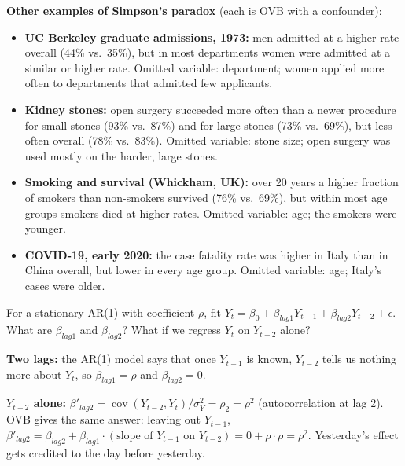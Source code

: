 \documentclass[11pt]{article}
\newcommand{\Cov}{\operatorname{cov}}
\begin{document}
\textbf{Other examples of Simpson's paradox} (each is OVB with a confounder):
\begin{itemize}[leftmargin=*,itemsep=2pt]
\item \textbf{UC Berkeley graduate admissions, 1973:} men admitted at a higher rate overall (44\% vs.\ 35\%), but in most departments women were
admitted at a similar or higher rate. Omitted variable: department; women applied more often to departments that admitted few applicants.
\item \textbf{Kidney stones:} open surgery succeeded more often than a newer procedure for small stones (93\% vs.\ 87\%) and for large stones
(73\% vs.\ 69\%), but less often overall (78\% vs.\ 83\%). Omitted variable: stone size; open surgery was used mostly on the harder, large stones.
\item \textbf{Smoking and survival (Whickham, UK):} over 20 years a higher fraction of smokers than non-smokers survived (76\% vs.\ 69\%), but
within most age groups smokers died at higher rates. Omitted variable: age; the smokers were younger.
\item \textbf{COVID-19, early 2020:} the case fatality rate was higher in Italy than in China overall, but lower in every age group.
Omitted variable: age; Italy's cases were older.
\end{itemize}

\begin{examplebox}[title={Question (10/14): regressing an AR(1) on two lags}]
For a stationary AR(1) with coefficient $\rho$, fit $Y_t=\beta_0+\beta_{lag1}Y_{t-1}+\beta_{lag2}Y_{t-2}+\epsilon$. What are $\beta_{lag1}$ and
$\beta_{lag2}$? What if we regress $Y_t$ on $Y_{t-2}$ alone?

\textbf{Two lags:} the AR(1) model says that once $Y_{t-1}$ is known, $Y_{t-2}$ tells us nothing more about $Y_t$, so $\beta_{lag1}=\rho$ and
$\beta_{lag2}=0$.

\textbf{$Y_{t-2}$ alone:} $\beta'_{lag2}=\Cov(Y_{t-2},Y_t)/\sigma_Y^2=\rho_2=\rho^2$ (autocorrelation at lag 2). OVB gives the same answer:
leaving out $Y_{t-1}$, $\beta'_{lag2}=\beta_{lag2}+\beta_{lag1}\cdot(\text{slope of }Y_{t-1}\text{ on }Y_{t-2})=0+\rho\cdot\rho=\rho^2$.
Yesterday's effect gets credited to the day before yesterday.
\end{examplebox}
\end{document}
